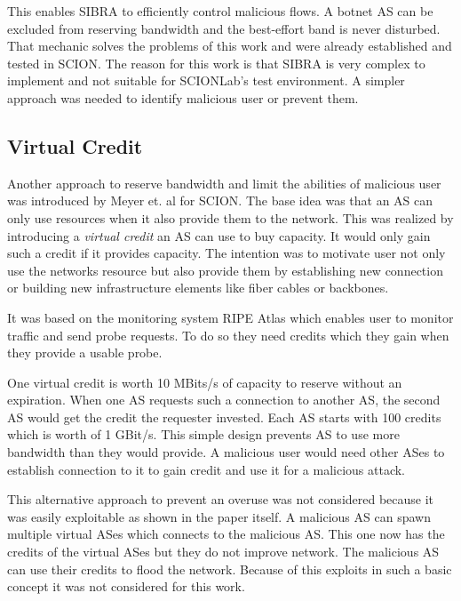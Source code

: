 \documentclass[thesis.tex]{subfiles}
\begin{document}
This enables SIBRA to efficiently control malicious flows. A botnet AS can be excluded from reserving bandwidth and the best-effort band is never disturbed. That mechanic solves the problems of this work and were already established and tested in SCION. The reason for this work is that SIBRA is very complex to implement and not suitable for SCIONLab's test environment. A simpler approach was needed to identify malicious user or prevent them.

\subsection{Virtual Credit} \cite{Meyer.2017}
Another approach to reserve bandwidth and limit the abilities of malicious user was introduced by Meyer et. al for SCION. The base idea was that an AS can only use resources when it also provide them to the network. This was realized by introducing a \textit{virtual credit} an AS can use to buy capacity. It would only gain such a credit if it provides capacity. The intention was to motivate user not only use the networks resource but also provide them by establishing new connection or building new infrastructure elements like fiber cables or backbones.

It was based on the monitoring system RIPE Atlas \cite{Ripenetworkcoordinationcentre.19.04.2018} which enables user to monitor traffic and send probe requests. To do so they need credits which they gain when they provide a usable probe.

One virtual credit is worth 10 MBits/s of capacity to reserve without an expiration. When one AS requests such a connection to another AS, the second AS would get the credit the requester invested. Each AS starts with 100 credits which is worth of 1 GBit/s. This simple design prevents AS to use more bandwidth than they would provide. A malicious user would need other ASes to establish connection to it to gain credit and use it for a malicious attack.

This alternative approach to prevent an overuse was not considered because it was easily exploitable as shown in the paper itself. A malicious AS can spawn multiple virtual ASes which connects to the malicious AS. This one now has the credits of the virtual ASes but they do not improve network. The malicious AS can use their credits to flood the network. Because of this exploits in such a basic concept it was not considered for this work.
\end{document}

